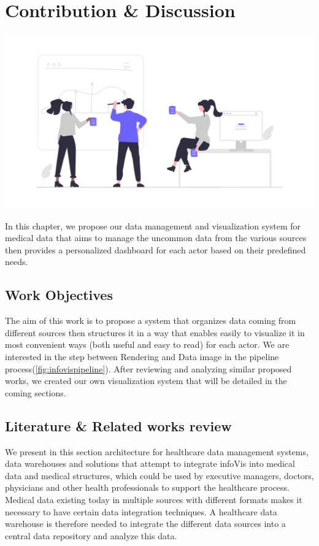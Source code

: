 \chapter{Contribution \& Discussion}
\renewcommand{\thesection}{\arabic{section}}
		




\label{chapitre4}
		
		\includegraphics [width=1 \linewidth, height=0.8\textheight, keepaspectratio] {images/chaptersFigures/contribution.png}
		
	
		
    \newpage
    \thispagestyle{plain}

In this chapter, we propose our data management and visualization system for medical data that aims to manage the uncommon data from the various sources then provides a personalized dashboard for each actor based on their predefined needs.




\section{Work Objectives}
The aim of this work is to propose a system that organizes data coming from different sources then structures it in a way that enables easily to visualize it in most convenient ways (both useful and easy to read) for each actor. We are interested in the step between Rendering and Data image in the pipeline process(\ref{fig:infovispipeline}). After reviewing and analyzing similar proposed works, we created our own visualization system that will be detailed in the coming sections.



\section{Literature \& Related works review}
We present in this section architecture for healthcare data management systems, data warehouses and solutions that attempt to integrate infoVis into medical data and medical structures, which could be used by executive managers, doctors, physicians and other health professionals to support the healthcare process.  Medical data existing today in multiple sources with different formats makes it necessary to have certain data integration techniques. A healthcare data warehouse is therefore needed to integrate the different data sources into a central data repository and analyze this data.
\bigbreak

